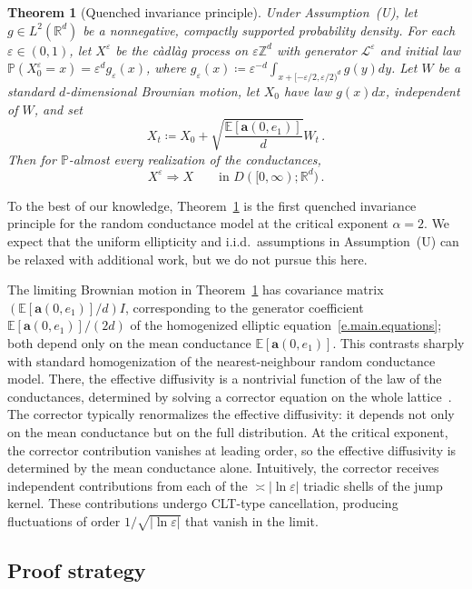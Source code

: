 \documentclass[11pt]{amsart}
\theoremstyle{plain}
\newtheorem{theorem}{Theorem}[section]
\theoremstyle{definition}
\theoremstyle{remark}
\newcommand{\E}{\mathbb{E}}
\newcommand{\Zd}{\mathbb{Z}^d}
\newcommand{\Rd}{\mathbb{R}^d}
\renewcommand{\a}{\mathbf{a}}
\newcommand{\eps}{\varepsilon}
\renewcommand{\P}{\mathbb{P}}
\begin{document}
	\begin{theorem}[Quenched invariance principle]
		\label{t.walk.intro}
		Under Assumption~\textup{(U)}, let $g \in L^2(\Rd)$ be a nonnegative, compactly supported probability density.
		For each $\eps \in (0,1)$, let $X^\eps$ be the c\`adl\`ag process on $\eps\Zd$ with generator $\mathcal{L}^\eps$ and initial law $\P(X_0^\eps = x) = \eps^d g_\eps(x)$, where $g_\eps(x) \coloneqq \eps^{-d}\int_{x + [-\eps/2, \eps/2)^d} g(y) dy$.
		Let $W$ be a standard $d$-dimensional Brownian motion, let $X_0$ have law $g(x) dx$, independent of $W$, and set
		\[
		X_t \coloneqq X_0 + \sqrt{\frac{\E[\a(0,e_1)]}{d}} W_t\,.
		\]
		Then for $\P$-almost every realization of the conductances,
		\[
		X^\eps \Rightarrow X
		\qquad\text{in } D([0,\infty); \Rd)\,.
		\]
	\end{theorem}
	
	To the best of our knowledge, Theorem~\ref{t.walk.intro} is the first quenched invariance principle for the random conductance model at the critical exponent $\alpha = 2$.
	We expect that the uniform ellipticity and i.i.d.\ assumptions in Assumption~\textup{(U)} can be relaxed with additional work, but we do not pursue this here.
	
	The limiting Brownian motion in Theorem~\ref{t.walk.intro} has covariance matrix $(\E[\a(0,e_1)]/d) I$, corresponding to the generator coefficient $\E[\a(0,e_1)]/(2d)$ of the homogenized elliptic equation~\eqref{e.main.equations}; both depend only on the mean conductance $\E[\a(0,e_1)]$.
	This contrasts sharply with standard homogenization of the nearest-neighbour random conductance model.
	There, the effective diffusivity is a nontrivial function of the law of the conductances, determined by solving a corrector equation on the whole lattice~\cite{Kozlov1979, PapanicolaouVaradhan1981}.
	The corrector typically renormalizes the effective diffusivity: it depends not only on the mean conductance but on the full distribution.
	At the critical exponent, the corrector contribution vanishes at leading order, so the effective diffusivity is determined by the mean conductance alone.
	Intuitively, the corrector receives independent contributions from each of the $\asymp |\ln\eps|$ triadic shells of the jump kernel.
	These contributions undergo CLT-type cancellation, producing fluctuations of order $1/\sqrt{|\ln\eps|}$ that vanish in the limit.
	
	\subsection{Proof strategy}
	
\end{document}
